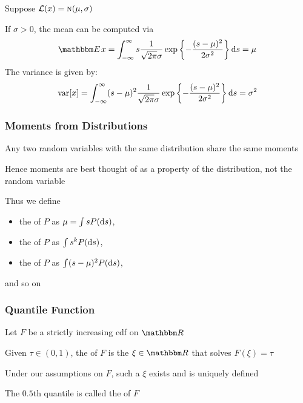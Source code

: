 \begin{frame}

    \vspace{2em}
    \Eg
    Suppose  $\mathcal L(x) = \textrm{\sc n}(\mu, \sigma)$
    
    If $\sigma > 0$, the mean can be computed via
    \begin{equation*}
        \EE x 
        = \int_{-\infty}^{\infty} s 
        \frac{1}{\sqrt{2 \pi} \sigma}
           \exp \left\{ - 
               \frac{(s - \mu)^2}{2\sigma^2} \right\}  \diff s
        = \mu
    \end{equation*}
    The variance is given by:
    \begin{equation*}
        \operatorname{var} [x]
        = \int_{-\infty}^{\infty}
            (s - \mu)^2
            \frac{1}{\sqrt{2 \pi} \sigma}
               \exp \left\{ - 
               \frac{(s - \mu)^2}{2\sigma^2} \right\}  \mathop{}\!\mathrm{d} s
        = \sigma^2
    \end{equation*}
    
\end{frame}

\begin{frame}\frametitle{Moments from Distributions}

    \vspace{2em}
    Any two random variables with the same
    distribution share the same moments
    
    Hence moments are best thought of as a
    property of the distribution, not the random variable
    
    \vspace{.7em}
    Thus we define 
    \begin{itemize}
        \item the  of $P$ as $\mu = \int s P(\mathop{}\!\mathrm{d} s)$,
        \item the  of $P$ as $\int s^k P(\mathop{}\!\mathrm{d} s)$, 
        \item the  of $P$ as $\int (s - \mu)^2 P(\mathop{}\!\mathrm{d} s)$,
    \end{itemize}
    and so on

\end{frame}

\begin{frame}\frametitle{Quantile Function}

    \vspace{2em}
    Let $F$ be a strictly increasing {\sc cdf} on $\RR$
    
    Given $\tau \in (0, 1)$, the  of $F$ is the $\xi \in \RR$ that solves $F(\xi) = \tau$
    
    Under our assumptions on $F$, such a $\xi$ exists and is uniquely defined
    
    The $0.5$th quantile is called the  of $F$

\end{frame}

